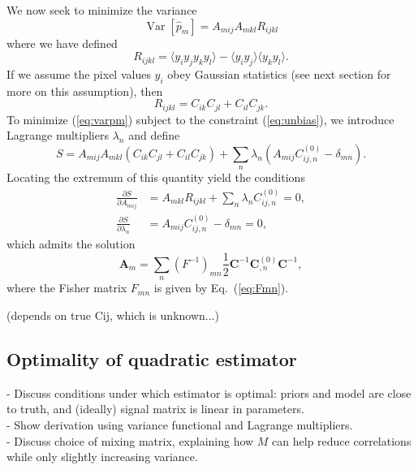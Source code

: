 \documentclass{article}
\newcommand{\mat}[1]{\mathbf{#1}}
\DeclareMathOperator{\Var}{Var}
\begin{document}
We now seek to minimize the variance
\begin{equation}
    \label{eq:varpm}
    \Var[\hat{p}_m] = A_{mij} A_{mkl} R_{ijkl}
\end{equation}
where we have defined
\begin{equation}
    R_{ijkl} = \langle y_i y_j y_k y_l \rangle - \langle y_i y_j \rangle \langle y_k y_l \rangle.
\end{equation}
If we assume the pixel values $y_i$ obey Gaussian statistics (see next section
for more on this assumption), then
\begin{equation}
    R_{ijkl} = C_{ik} C_{jl} + C_{il} C_{jk}.
\end{equation}
To minimize (\ref{eq:varpm}) subject to the constraint (\ref{eq:unbias}), we
introduce Lagrange multipliers $\lambda_n$ and define
\begin{equation}
    S = A_{mij} A_{mkl} (C_{ik} C_{jl} + C_{il} C_{jk}) + \sum_n \lambda_n \left(A_{mij} C_{ij,n}^{(0)} - \delta_{mn}\right).
\end{equation}
Locating the extremum of this quantity yield the conditions
\begin{align}
    \frac{\partial S}{\partial A_{mij}} &= A_{mkl} R_{ijkl} + \sum_n \lambda_n C_{ij,n}^{(0)} = 0, \\
    \frac{\partial S}{\partial \lambda_n} &= A_{mij} C_{ij,n}^{(0)} - \delta_{mn} = 0,
\end{align}
which admits the solution
\begin{equation}
    \mat{A}_m = \sum_n (F^{-1})_{mn} \frac{1}{2} \mat{C}^{-1} \mat{C}_{,n}^{(0)} \mat{C}^{-1},
\end{equation}
where the Fisher matrix $F_{mn}$ is given by Eq.~(\ref{eq:Fmn}).

(depends on true Cij, which is unknown...)

\subsection{Optimality of quadratic estimator}
\label{sec:optimal}

- Discuss conditions under which estimator is optimal: priors and model are
close to truth, and (ideally) signal matrix is linear in parameters. \\
- Show derivation using variance functional and Lagrange multipliers. \\
- Discuss choice of mixing matrix, explaining how $M$ can help reduce
correlations while only slightly increasing variance.
\end{document}
